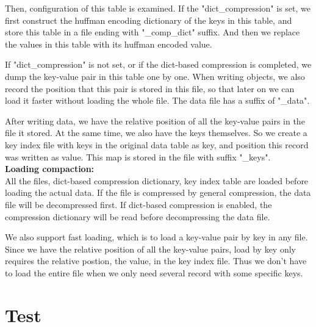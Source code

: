 \documentclass[a4paper]{article}
\begin{document}
  Then, configuration of this table is examined. If the "dict\_compression" is set, we first construct the huffman encoding dictionary of the keys in this table, and store this table in a file ending with "\_comp\_dict" suffix. And then we replace the values in this table with its huffman encoded value.

  If "dict\_compression" is not set, or if the dict-based compression is completed, we dump the key-value pair in this table one by one. When writing objects, we also record the position that this pair is stored in this file, so that later on we can load it faster without loading the whole file. The data file has a suffix of "\_data".

  After writing data, we have the relative position of all the key-value pairs in the file it stored. At the same time, we also have the keys themselves. So we create a key index file with keys in the original data table as key, and position this record was written as value. This map is stored in the file with suffix "\_keys".\\

  \textbf{Loading compaction:}\\

  All the files, dict-based compression dictionary, key index table are loaded before loading the actual data. If the file is compressed by general compression, the data file will be decompressed first. If dict-based compression is enabled, the compression dictionary will be read before decompressing the data file.

  We also support fast loading, which is to load a key-value pair by key in any file. Since we have the relative position of all the key-value pairs, load by key only requires the relative postion, the value, in the key index file. Thus we don't have to load the entire file when we only need several record with some specific keys.


\section{Test}
\end{document}
